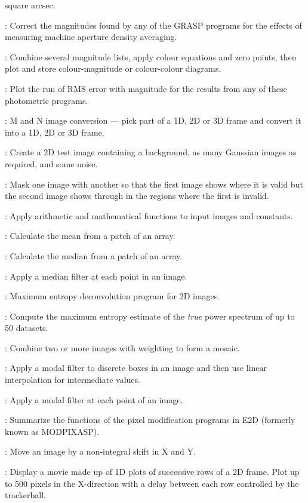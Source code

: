 \begin{description}
square arcsec.
\item [MAGCOR]: Correct the magnitudes found by any of the GRASP programs for
the effects of measuring machine aperture density averaging.
\item [MAGDIAG]: Combine several magnitude lists, apply colour equations and
zero points, then plot and store colour-magnitude or colour-colour diagrams.
\item [MAGRMS]: Plot the run of RMS error with magnitude for the results from
any of these photometric programs.
\item [MANIC]: M and N image conversion --- pick part of a 1D, 2D or 3D frame
and convert it into a 1D, 2D or 3D frame.
\item [MANYG]: Create a 2D test image containing a background, as many Gaussian
images as required, and some noise.
\item [MASK]: Mask one image with another so that the first image shows where
it is valid but the second image shows through in the regions where the first
is invalid.
\item [MATHS]: Apply arithmetic and mathematical functions to input images and
constants.
\item [MEAN*]: Calculate the mean from a patch of an array.
\item [MEDBOX*]: Calculate the median from a patch of an array.
\item [MEDIAN]: Apply a median filter at each point in an image.
\item [MEM]: Maximum entropy deconvolution program for 2D images.
\item [MEMPOW]: Compute the maximum entropy estimate of the {\em true} power
spectrum of up to 50 datasets.
\item [MERGE]: Combine two or more images with weighting to form a mosaic.
\item [MODAL]: Apply a modal filter to discrete boxes in an image and then use
linear interpolation for intermediate values.
\item [MODE]: Apply a modal filter at each point of an image.
\item [MODHELP]: Summarize the functions of the pixel modification programs
in E2D (formerly known as MODPIXASP).
\item [MOVE]: Move an image by a non-integral shift in X and Y.
\item [MOVIE]: Display a movie made up of 1D plots of successive rows of a
2D frame.
Plot up to 500 pixels in the X-direction with a delay between each row
controlled by the trackerball.

\end{description}
